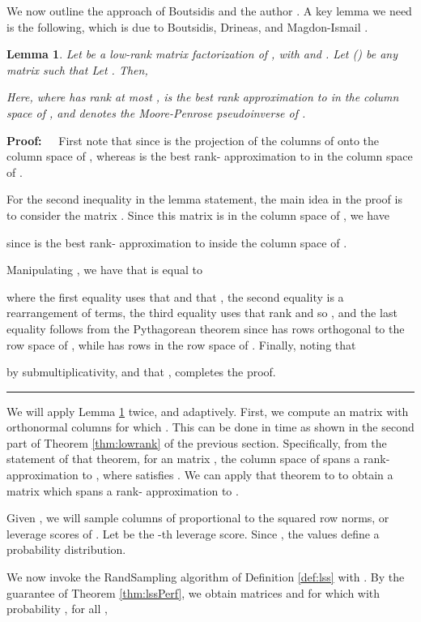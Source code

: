 \documentclass[11pt]{article}
\newtheorem{lemma}[theorem]{Lemma}
\newenvironment{proof}{\begin{trivlist} \item {\bf Proof:~~}}
  {\qed\end{trivlist}}
\def\qed{\hfill\rule{2mm}{2mm}}
\begin{document}
We now outline the approach of Boutsidis and the author \cite{BW14}. A key lemma we need is the following, which
is due to Boutsidis, Drineas, and Magdon-Ismail \cite{BDM11a}. 
\begin{lemma}
\label{lem:structural}
Let  
be a low-rank matrix factorization of , with 
and .
Let  () be any matrix such that 
Let . Then,

Here,  
where  has rank at most , 
 is the
best rank  approximation to  in the column space of , and  denotes the Moore-Penrose 
pseudoinverse of .
\end{lemma}
\begin{proof}
First note that 
 since  is the projection of the columns of  onto the column
space of , whereas  is the best rank- approximation to  in the column space of . 

For the second inequality in the lemma statement, 
the main idea in the proof is to consider the matrix . 
Since this matrix is in the column space
of , we have 

since  is the best rank- approximation to  inside the column space of . 

Manipulating , we have that  is equal to 

where the first equality uses that  and that , 
the second equality is a rearrangement of terms,
the third equality uses that rank and so , 
and the last equality follows from
the Pythagorean theorem since  
has rows orthogonal to the row space of , while 
 has rows in the row space of . Finally, noting that 

by submultiplicativity, and that , completes the proof. 
\end{proof}
We will apply Lemma \ref{lem:structural} twice, and adaptively. First, we compute an  matrix  with
orthonormal columns for which . 
This can be done in 
time as shown in the second part of Theorem \ref{thm:lowrank} of the previous section. Specifically, from the statement of that theorem,
for an  matrix , the column space of  spans a  rank- approximation to , where
 satisfies . We can apply that theorem to  to obtain a 
matrix  which spans a  rank- approximation to . 

Given , we will sample  columns of  proportional to the squared row norms, or leverage scores of .
Let  be the -th leverage score. 
Since , the  values
define a probability distribution. 

We now invoke the {\textsc RandSampling} algorithm of
Definition \ref{def:lss} with . By the guarantee of Theorem \ref{thm:lssPerf},
we obtain matrices  and  for which with probability , for all ,
\end{document}
